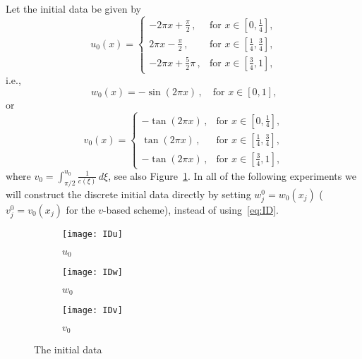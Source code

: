 \documentclass[11pt,leqno]{amsart}
\begin{document}
Let the initial data be given by
\begin{equation*}
  u_0(x)= \begin{cases} -2\pi x + \frac{\pi}{2} \,, & \text{for $x\in [0,\frac{1}{4} ]$,}\\
    2\pi x- \frac{\pi}{2} \,, &\text{for $x\in [\frac{1}{4} ,\frac{3}{4} ]$,}\\ -2\pi x + \frac{5}{2} \pi\,,&\text{for $x \in [\frac{3}{4} ,1]$,} \end{cases}
\end{equation*}
i.e., 
\begin{equation*}
 w_0(x)=-\sin(2\pi x)\,, \quad \text{for $x\in [0,1]$,}
\end{equation*}
or 
\begin{equation*}
v_0(x)=\begin{cases} -\tan(2\pi x) \,, & \text{for $x\in [0,\frac{1}{4} ]$,}\\
    \tan(2\pi x)\,, &\text{for $x\in [\frac{1}{4} ,\frac{3}{4} ]$,}\\
-\tan(2\pi x)\,,&\text{for $x \in [\frac{3}{4} ,1]$,} \end{cases}  
\end{equation*}
where $v_0=\int_{\pi/2}^{u_0}\frac{1}{c(\xi)}\,d\xi$, see also Figure~\ref{fig:ID}. In all of the following experiments we will construct the discrete initial data directly by setting $w^0_j=w_0(x_j)$ ($v^0_j=v_0(x_j)$ for the $v$-based scheme), instead of using~\eqref{eq:ID}.
\begin{figure}
  \centering
\begin{subfigure}[b]{0.3\textwidth}\centering
  \texttt{[image: IDu]}
\caption{$u_0$}
\end{subfigure}
\begin{subfigure}[b]{0.3\textwidth}\centering
  \texttt{[image: IDw]}
\caption{$w_0$}
\end{subfigure}
\begin{subfigure}[b]{0.3\textwidth}\centering
  \texttt{[image: IDv]}
\caption{$v_0$}
\end{subfigure}
  \caption{The initial data}
\label{fig:ID}
\end{figure}
 
\end{document}
